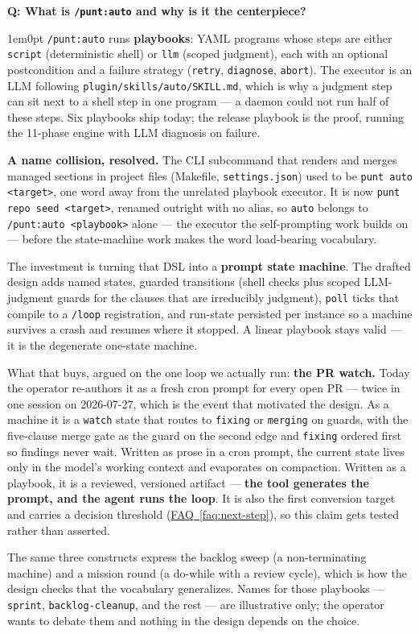 \documentclass[11pt,letterpaper]{article}
\newcounter{faqnum}
\newenvironment{faqpair}[1]{%
  \needspace{4\baselineskip}%
  \vspace{0.5em}%
  \refstepcounter{faqnum}%
  \noindent\textbf{\color{SectionBlue}Q\thefaqnum: #1}\par\nopagebreak[4]%
  \vspace{0.2em}%
  \begin{adjustwidth}{1em}{0pt}%
  \setlength{\parindent}{0pt}%
}{%
  \end{adjustwidth}%
  \vspace{0.5em}%
}
\newcommand{\faqref}[1]{\hyperref[#1]{FAQ~\ref*{#1}}}
\begin{document}
\begin{faqpair}{What is \texttt{/punt:auto} and why is it the centerpiece?}\label{faq:self-prompting}
  \texttt{/punt:auto} runs \textbf{playbooks}: YAML programs whose steps are
  either \texttt{script} (deterministic shell) or \texttt{llm} (scoped
  judgment), each with an optional postcondition and a failure strategy
  (\texttt{retry}, \texttt{diagnose}, \texttt{abort}). The executor is an LLM
  following \texttt{plugin/skills/auto/SKILL.md}, which is why a judgment step can sit
  next to a shell step in one program --- a daemon could not run half of these
  steps. Six playbooks ship today; the release playbook is the proof, running
  the 11-phase engine with LLM diagnosis on failure.

  \textbf{A name collision, resolved.} The CLI subcommand that renders and
  merges managed sections in project files (Makefile, \texttt{settings.json})
  used to be \texttt{punt auto <target>}, one word away from the unrelated
  playbook executor. It is now \texttt{punt repo seed <target>}, renamed outright
  with no alias, so \texttt{auto} belongs to \texttt{/punt:auto <playbook>}
  alone --- the executor the self-prompting work builds on --- before the
  state-machine work makes the word load-bearing vocabulary.

  The investment is turning that DSL into a \textbf{prompt state machine}. The
  drafted design adds named states, guarded transitions (shell checks plus
  scoped LLM-judgment guards for the clauses that are irreducibly judgment),
  \texttt{poll} ticks that compile to a \texttt{/loop} registration, and
  run-state persisted per instance so a machine survives a crash and resumes
  where it stopped. A linear playbook stays valid --- it is the degenerate
  one-state machine.

  What that buys, argued on the one loop we actually run: \textbf{the PR
  watch.} Today the operator re-authors it as a fresh cron prompt for every
  open PR --- twice in one session on 2026-07-27, which is the event that
  motivated the design. As a machine it is a \texttt{watch} state that routes
  to \texttt{fixing} or \texttt{merging} on guards, with the five-clause merge
  gate as the guard on the second edge and \texttt{fixing} ordered first so
  findings never wait. Written as prose in a cron prompt, the current state
  lives only in the model's working context and evaporates on compaction.
  Written as a playbook, it is a reviewed, versioned artifact ---
  \textbf{the tool generates the prompt, and the agent runs the loop}. It is
  also the first conversion target and carries a decision threshold
  (\faqref{faq:next-step}), so this claim gets tested rather than asserted.

  The same three constructs express the backlog sweep (a non-terminating
  machine) and a mission round (a do-while with a review cycle), which is how
  the design checks that the vocabulary generalizes. Names for those playbooks
  --- \texttt{sprint}, \texttt{backlog-cleanup}, and the rest --- are
  illustrative only; the operator wants to debate them and nothing in the
  design depends on the choice.
\end{faqpair}
\end{document}
